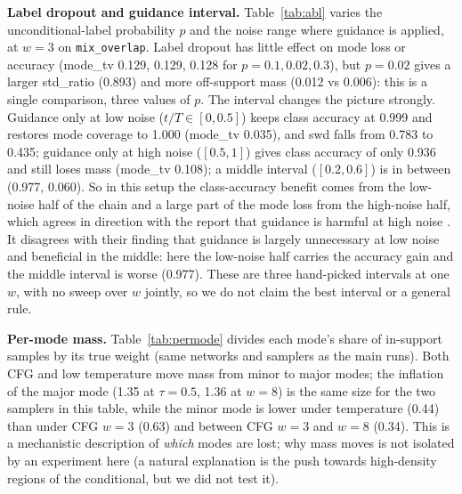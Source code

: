 \textbf{Label dropout and guidance interval.} Table~\ref{tab:abl} varies the unconditional-label probability $p$ and the noise range where guidance is applied, at $w=3$ on \texttt{mix\_overlap}. Label dropout has little effect on mode loss or accuracy (mode\_tv 0.129, 0.129, 0.128 for $p=0.1,0.02,0.3$), but $p=0.02$ gives a larger std\_ratio (0.893) and more off-support mass (0.012 vs 0.006): this is a single comparison, three values of $p$. The interval changes the picture strongly. Guidance only at low noise ($t/T\in[0,0.5]$) keeps class accuracy at 0.999 and restores mode coverage to 1.000 (mode\_tv 0.035), and swd falls from 0.783 to 0.435; guidance only at high noise ($[0.5,1]$) gives class accuracy of only 0.936 and still loses mass (mode\_tv 0.108); a middle interval ($[0.2,0.6]$) is in between (0.977, 0.060). So in this setup the class-accuracy benefit comes from the low-noise half of the chain and a large part of the mode loss from the high-noise half, which agrees in direction with the report that guidance is harmful at high noise \cite{kynknniemi2024applying}. It disagrees with their finding that guidance is largely unnecessary at low noise and beneficial in the middle: here the low-noise half carries the accuracy gain and the middle interval is worse (0.977). These are three hand-picked intervals at one $w$, with no sweep over $w$ jointly, so we do not claim the best interval or a general rule.

\textbf{Per-mode mass.} Table~\ref{tab:permode} divides each mode's share of in-support samples by its true weight (same networks and samplers as the main runs). Both CFG and low temperature move mass from minor to major modes; the inflation of the major mode (1.35 at $\tau=0.5$, 1.36 at $w=8$) is the same size for the two samplers in this table, while the minor mode is lower under temperature (0.44) than under CFG $w=3$ (0.63) and between CFG $w=3$ and $w=8$ (0.34). This is a mechanistic description of \emph{which} modes are lost; why mass moves is not isolated by an experiment here (a natural explanation is the push towards high-density regions of the conditional, but we did not test it).

\begin{table}[t]\centering\caption{Ablations at $w=3$ on \texttt{mix\_overlap} (five seeds), columns as in Table~\ref{tab:sweep}.}\label{tab:abl}

\end{table}

\begin{table}[t]\centering\caption{Mass in each right-class mode relative to its true weight (1.0 is exact; five seeds, mean $\pm$ sd), \texttt{mix\_overlap}.}\label{tab:permode}
\resizebox{\columnwidth}{!}{}
\end{table}
